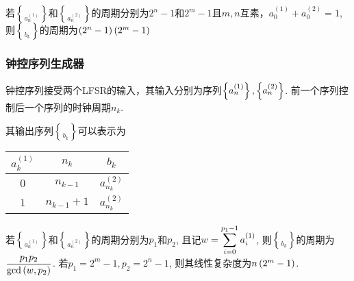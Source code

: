 若$\brace{a_n^{(1)}}$和$\brace{a_n^{(2)}}$的周期分别为$2^n-1$和$2^m-1$且$m, n$互素，$a_0^{(1)}+a_0^{(2)}=1$, 则$\brace{b_k}$的周期为$\pth{2^n-1}\pth{2^m-1}$
\subsubsection{钟控序列生成器}
钟控序列接受两个LFSR的输入，其输入分别为序列$\brace{a_n^{(1)}}, \brace{a_n^{(2)}}$. 前一个序列控制后一个序列的时钟周期$n_k$.\par
其输出序列$\brace{b_k}$可以表示为
\begin{table}[H]
    \centering
    \begin{tabular}{c|c|c}\hline
        $a_k^{(1)}$&$n_k$&$b_k$\\\hline
        $0$&$n_{k-1}$&$a_{n_k}^{(2)}$\\\hline
        $1$&$n_{k-1}+1$&$a_{n_k}^{(2)}$\\\hline
    \end{tabular}
\end{table}

若$\brace{a_n^{(1)}}$和$\brace{a_n^{(2)}}$的周期分别为$p_1$和$p_2$, 且记$\ext w=\sum_{i=0}^{p_1-1}a_i^{(1)}$, 则$\brace{b_k}$的周期为$\ext\frac{p_1p_2}{\gcd\pth{w, p_2}}$. 若$p_1=2^m-1, p_2=2^n-1$, 则其线性复杂度为$n\pth{2^m-1}$.
